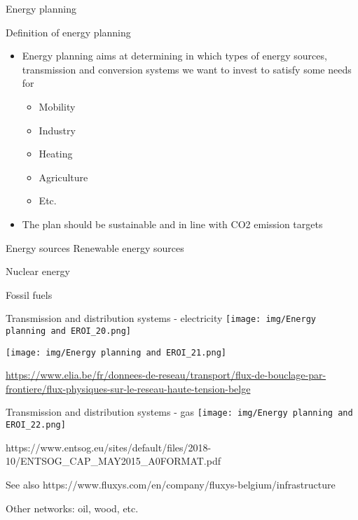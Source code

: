\begin{frame}{Energy planning}
\label{energy-planning}
\end{frame}

\begin{frame}{Definition of energy planning}
\label{definition-of-energy-planning}
\begin{itemize}
\tightlist
\item
  Energy planning aims at determining in which types of energy sources,
  transmission and conversion systems we want to invest to satisfy some
  needs for

  \begin{itemize}
  \tightlist
  \item
    Mobility
  \item
    Industry
  \item
    Heating
  \item
    Agriculture
  \item
    Etc.
  \end{itemize}
\item
  The plan should be sustainable and in line with CO2 emission targets
\end{itemize}
\end{frame}

\begin{frame}{Energy sources}
\label{energy-sources}
Renewable energy sources

Nuclear energy

Fossil fuels
\end{frame}

\begin{frame}{Transmission and distribution systems - electricity}
\label{transmission-and-distribution-systems---electricity}
\texttt{[image: img/Energy planning and EROI\_20.png]}

\texttt{[image: img/Energy planning and EROI\_21.png]}

\url{https://www.elia.be/fr/donnees-de-reseau/transport/flux-de-bouclage-par-frontiere/flux-physiques-sur-le-reseau-haute-tension-belge}
\end{frame}

\begin{frame}{Transmission and distribution systems - gas}
\label{transmission-and-distribution-systems---gas}
\texttt{[image: img/Energy planning and EROI\_22.png]}

https://www.entsog.eu/sites/default/files/2018-10/ENTSOG\_CAP\_MAY2015\_A0FORMAT.pdf

See also https://www.fluxys.com/en/company/fluxys-belgium/infrastructure

Other networks: oil, wood, etc.
\end{frame}

